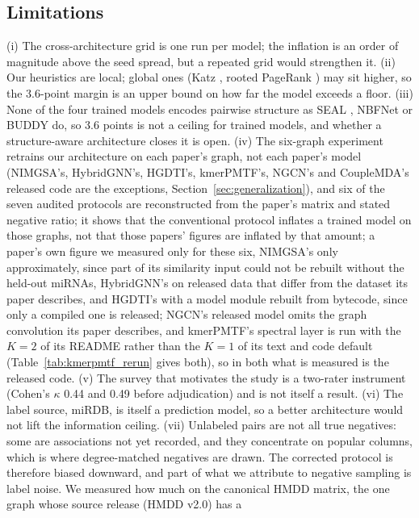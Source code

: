 \documentclass[review]{elsarticle}
\begin{document}
\subsection{Limitations}
\label{sec:limitations}
(i) The cross-architecture grid is one run per model; the inflation is an order of magnitude above the seed
spread, but a repeated grid would strengthen it. (ii) Our heuristics are local; global ones (Katz \cite{katz1953status}, rooted
PageRank \cite{liben2007link}) may sit higher, so the 3.6-point margin is an upper bound on how far the model exceeds a floor.
(iii) None of the four trained models encodes pairwise structure as SEAL \cite{zhang2018seal}, NBFNet
\cite{zhu2021nbfnet} or BUDDY \cite{chamberlain2023buddy} do, so 3.6 points is not a ceiling for trained models,
and whether a structure-aware architecture closes it is open. (iv) The six-graph experiment retrains our
architecture on each paper's graph, not each paper's model (NIMGSA's, HybridGNN's, HGDTI's, kmerPMTF's, NGCN's and CoupleMDA's released code are the
exceptions, Section~\ref{sec:generalization}), and six of the seven audited protocols are
reconstructed from the paper's matrix and stated negative ratio; it shows that the conventional protocol inflates
a trained model on those graphs, not that those papers' figures are inflated by that amount; a paper's own
figure we measured only for these six, NIMGSA's only approximately, since part of its similarity
input could not be rebuilt without the held-out miRNAs, HybridGNN's on released data that differ from
the dataset its paper describes, and HGDTI's with a model module rebuilt from bytecode, since only a compiled
one is released; NGCN's released model omits the graph convolution its paper describes, and kmerPMTF's spectral layer is run with the $K=2$ of its README rather than the $K=1$ of its text and code default (Table~\ref{tab:kmerpmtf_rerun} gives both), so in both what is measured is the released code. (v) The survey that
motivates the study is a two-rater instrument (Cohen's $\kappa$ 0.44 and 0.49 before adjudication) and is not
itself a result. (vi) The label source, miRDB, is itself a prediction model, so a better architecture would not
lift the information ceiling. (vii) Unlabeled pairs are not all true negatives: some are associations not yet
recorded, and they concentrate on popular columns, which is where degree-matched negatives are drawn. The
corrected protocol is therefore biased downward, and part of what we attribute to negative sampling is label
noise. We measured how much on the canonical HMDD matrix, the one graph whose source release (HMDD v2.0) has a
\end{document}
